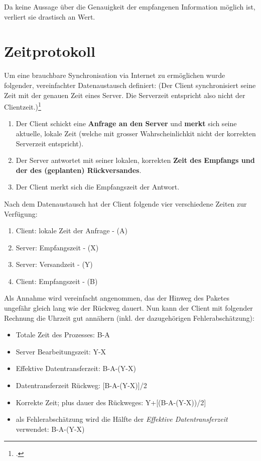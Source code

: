 Da keine Aussage über die Genauigkeit der empfangenen Information möglich ist, verliert sie drastisch an Wert.

\section{Zeitprotokoll}
Um eine brauchbare Synchronisation via Internet zu ermöglichen wurde folgender, vereinfachter Datenaustausch definiert: (Der Client synchronisiert seine Zeit mit der genauen Zeit eines Server. Die Serverzeit entspricht also nicht der Clientzeit.)\footcite{stackoverflowNtp}

\begin{enumerate}
\item Der Client schickt eine \textbf{Anfrage an den Server} und \textbf{merkt} sich seine aktuelle, lokale Zeit (welche mit grosser Wahrscheinlichkit nicht der korrekten Serverzeit entspricht).
\item Der Server antwortet mit seiner lokalen, korrekten \textbf{Zeit des Empfangs und der des (geplanten) Rückversandes}.
\item Der Client merkt sich die Empfangszeit der Antwort. 
\end{enumerate}
\vspace{1em}
Nach dem Datenaustausch hat der Client folgende vier verschiedene Zeiten zur Verfügung:
\begin{enumerate}
\item Client: lokale Zeit der Anfrage - (A)
\item Server: Empfangszeit - (X)
\item Server: Versandzeit - (Y)
\item Client: Empfangszeit - (B)
\end{enumerate}
\vspace{1em}
Als Annahme wird vereinfacht angenommen, das der Hinweg des Paketes ungefähr gleich lang wie der Rückweg dauert.
\vspace{1em}
Nun kann der Client mit folgender Rechnung die Uhrzeit gut annähern (inkl. der dazugehörigen Fehlerabschätzung):
\begin{itemize}
\item Totale Zeit des Prozesses: B-A
\item Server Bearbeitungszeit: Y-X
\item Effektive Datentransferzeit: B-A-(Y-X)
\item Datentransferzeit Rückweg: [B-A-(Y-X)]/2
\item Korrekte Zeit; plus dauer des Rückweges: Y+[(B-A-(Y-X))/2]
\item als Fehlerabschätzung wird die Hälfte der \textit{Effektive Datentransferzeit} verwendet: B-A-(Y-X)
\end{itemize}

